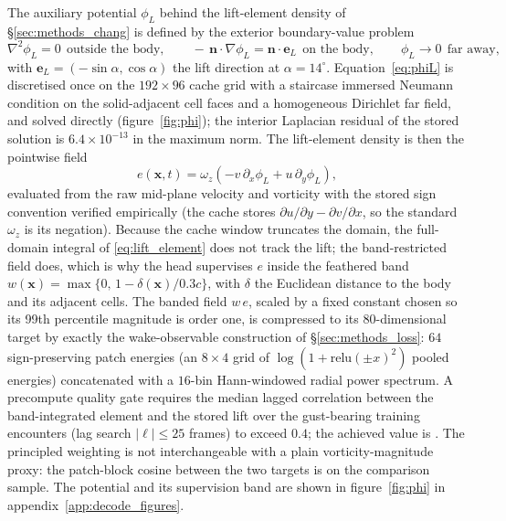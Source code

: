 The auxiliary potential $\phi_L$ behind the lift-element density of
\S\ref{sec:methods_chang} is defined by the exterior boundary-value problem
\begin{equation}
  \nabla^2 \phi_L = 0 \ \ \text{outside the body}, \qquad
  -\,\mathbf{n} \cdot \nabla \phi_L = \mathbf{n} \cdot \mathbf{e}_L
  \ \ \text{on the body}, \qquad
  \phi_L \to 0 \ \ \text{far away},
  \label{eq:phiL}
\end{equation}
with $\mathbf{e}_L = (-\sin\alpha, \cos\alpha)$ the lift direction at
$\alpha = 14^\circ$. Equation~\eqref{eq:phiL} is discretised once on the
$192 \times 96$ cache grid with a staircase immersed Neumann condition on
the solid-adjacent cell faces and a homogeneous Dirichlet far field, and
solved directly (figure~\ref{fig:phi}); the interior Laplacian residual of the
stored solution is $6.4 \times 10^{-13}$ in the maximum norm. The lift-element
density is then the pointwise field
\begin{equation}
  e(\mathbf{x}, t) = \omega_z \left(-v\,\partial_x \phi_L
  + u\,\partial_y \phi_L\right),
  \label{eq:lift_element}
\end{equation}
evaluated from the raw mid-plane velocity and vorticity with the stored
sign convention verified empirically (the cache stores
$\partial u/\partial y - \partial v/\partial x$, so the standard
$\omega_z$ is its negation). Because the cache window truncates the
domain, the full-domain integral of \eqref{eq:lift_element} does not track
the lift; the band-restricted field does, which is why the head supervises $e$
inside the feathered band $w(\mathbf{x}) =
\max\{0,\, 1 - \delta(\mathbf{x})/0.3c\}$, with $\delta$ the Euclidean
distance to the body and its adjacent cells. The banded field $w\,e$,
scaled by a fixed constant chosen so its 99th percentile magnitude is
order one, is compressed to its $80$-dimensional target by exactly the
wake-observable construction of \S\ref{sec:methods_loss}: $64$ sign-preserving
patch energies (an $8 \times 4$ grid of $\log(1 + \mathrm{relu}(\pm x)^2)$
pooled energies) concatenated with a $16$-bin Hann-windowed radial power
spectrum. A precompute quality gate requires the median lagged
correlation between the band-integrated element and the stored lift over
the gust-bearing training encounters (lag search $|\ell| \le 25$ frames)
to exceed $0.4$; the achieved value is \NbQcMedianCorr. The principled
weighting is not interchangeable with a plain vorticity-magnitude proxy:
the patch-block cosine between the two targets is \NbProxyCosine{} on the
comparison sample. The potential and its supervision band are shown in
figure~\ref{fig:phi} in appendix~\ref{app:decode_figures}.\re


